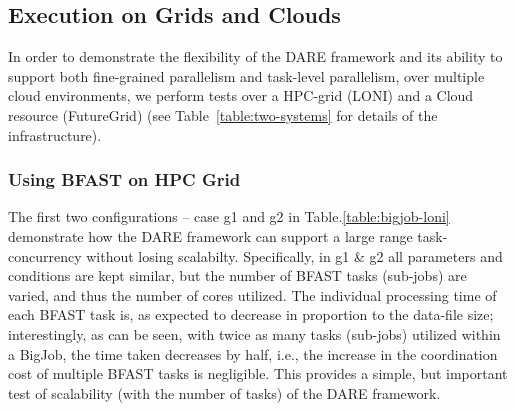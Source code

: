 \documentclass{acm_proc_article-sp}
\begin{document}


\subsection{Execution on Grids and Clouds}

In order to demonstrate the flexibility of the DARE framework and its
ability to support both fine-grained parallelism and task-level
parallelism, over multiple cloud environments, we perform tests over a
HPC-grid (LONI) and a Cloud resource (FutureGrid) (see
Table~\ref{table:two-systems} for details of the infrastructure).


\subsubsection{Using BFAST on HPC Grid}

The first two configurations -- case g1 and g2 in
Table.\ref{table:bigjob-loni} demonstrate how the DARE framework can
support a large range task-concurrency without losing scalabilty.
Specifically, in g1 \& g2 all parameters and conditions are kept
similar, but the number of BFAST tasks (sub-jobs) are varied, and thus
the number of cores utilized.  The individual processing time of each
BFAST task is, as expected to decrease in proportion to the data-file
size; interestingly, as can be seen, with twice as many tasks
(sub-jobs) utilized within a BigJob, the time taken decreases by half,
i.e., the increase in the coordination cost of multiple BFAST tasks is
negligible. This provides a simple, but important test of scalability
(with the number of tasks) of the DARE framework.  
\end{document}
